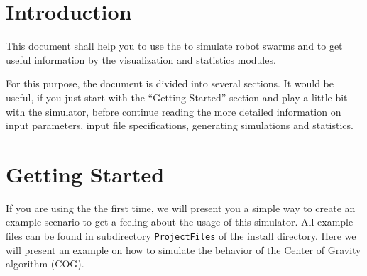
\section{Introduction}
This document shall help you to use the \RSS to simulate robot swarms and to get useful information by the visualization and statistics modules.

For this purpose, the document is divided into several sections. It would be useful, if you just start with the ``Getting Started'' section and play a little bit with the simulator, before continue reading the more detailed information on input parameters, input file specifications, generating simulations and statistics.


\section{Getting Started}
If you are using the \RSS the first time, we will present you a simple way to create an example scenario to get a feeling about the usage of this simulator. All example files can be found in subdirectory {\tt ProjectFiles} of the install directory. Here we will present an example on how to simulate the behavior of the {\sffamily Center of Gravity} algorithm (COG).

